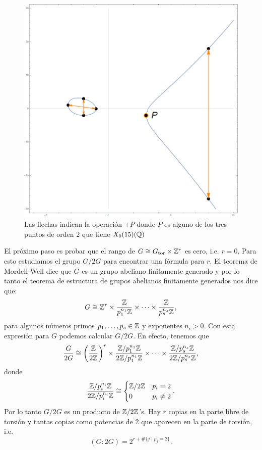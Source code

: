 \begin{figure}
\begin{minipage}[t]{0.3\textwidth}
\end{minipage}
\begin{minipage}[t]{0.3\textwidth}
	\includegraphics[width=\textwidth]{figuras/orbitas-puntos-3}
\end{minipage}
\caption{Las flechas indican la operación $+P$ donde $P$ es alguno de los tres puntos de orden 2 que tiene $X_0(15)(\mathbb{Q})$}
\label{fig:orbitas-puntos}
\end{figure}


El próximo paso es probar que el rango de $G\cong G_\mathrm{tor}\times\mathbb{Z}^r$ es cero, i.e. $r=0$. Para esto estudiamos el grupo $G/2G$ para encontrar una fórmula para $r$. El teorema de Mordell-Weil dice que $G$ es un grupo abeliano finitamente generado y por lo tanto el teorema de estructura de grupos abelianos finitamente generados nos dice que:
\[
	G\cong\mathbb{Z}^r\times\frac{\mathbb{Z}}{p_1^{n_1}\mathbb{Z}}\times\cdots\times\frac{\mathbb{Z}}{p_s^{n_s}\mathbb{Z}},
\]
para algunos números primos $p_1,\ldots,p_s\in\mathbb{Z}$ y exponentes $n_i>0$. Con esta expresión para $G$ podemos calcular $G/2G$. En efecto, tenemos que
\[
	\frac{G}{2G}\cong\left(\frac{\mathbb{Z}}{2\mathbb{Z}}\right)^r\times\frac{\mathbb{Z}/p_1^{n_1}\mathbb{Z}}{2\mathbb{Z}/p_1^{n_1}\mathbb{Z}}\times\cdots\times\frac{\mathbb{Z}/p_s^{n_s}\mathbb{Z}}{2\mathbb{Z}/p_s^{n_s}\mathbb{Z}},
\]
donde
\[
	\frac{\mathbb{Z}/p_i^{n_i}\mathbb{Z}}{2\mathbb{Z}/p_i^{n_i}\mathbb{Z}}\cong
	\begin{cases}
	\mathbb{Z}/2\mathbb{Z} & p_i=2\\
	0 & p_i\neq 2
	\end{cases}.
\]
Por lo tanto $G/2G$ es un producto de $\mathbb{Z}/2\mathbb{Z}$'s. Hay $r$ copias en la parte libre de torsión y tantas copias como potencias de 2 que aparecen en la parte de torsión, i.e.
\begin{equation}\label{eq:indice-G-2G-inicial}
	(G:2G)=2^{r+\#\{j\mid p_j=2\}}.
\end{equation}

